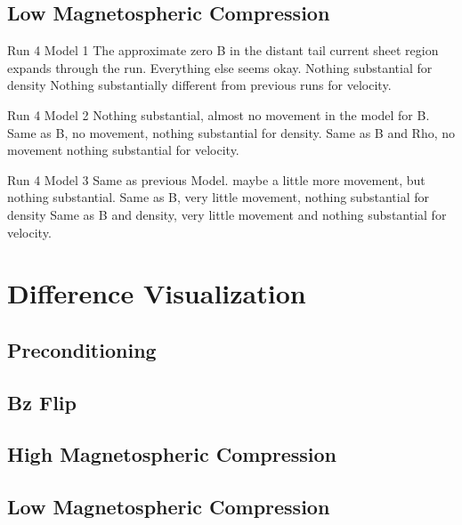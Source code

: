 \subsection{Low Magnetospheric Compression}

Run 4 Model 1
The approximate zero B in the distant tail current sheet region expands through
the run. Everything else seems okay.
Nothing substantial for density
Nothing substantially different from previous runs for velocity.

Run 4 Model 2
Nothing substantial, almost no movement in the model for B.
Same as B, no movement, nothing substantial for density.
Same as B and Rho, no movement nothing substantial for velocity.

Run 4 Model 3
Same as previous Model. maybe a little more movement, but nothing substantial.
Same as B, very little movement, nothing substantial for density
Same as B and density, very little movement and nothing substantial for velocity.




\section{Difference Visualization}
\subsection{Preconditioning}
\subsection{Bz Flip}
\subsection{High Magnetospheric Compression}
\subsection{Low Magnetospheric Compression}
